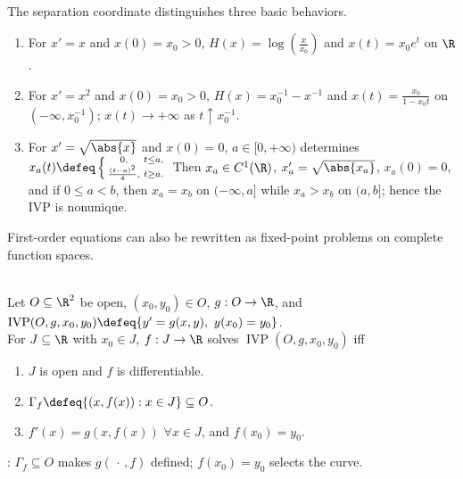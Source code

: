 \begin{example} \label{ex:autonomous-growth-blowup-and-waiting} \\
The separation coordinate distinguishes three basic behaviors.
\begin{enumerate}[label=(\roman*)]
\setlength{\itemsep}{0pt}
\item For $x'=x$ and $x(0)=x_0>0$, $H(x)=\log\left(\frac{x}{x_0}\right)$ and $x(t)=x_0e^t$ on $\R$.
\item For $x'=x^2$ and $x(0)=x_0>0$, $H(x)=x_0^{-1}-x^{-1}$ and $x(t)=\frac{x_0}{1-x_0t}$ on $(-\infty,x_0^{-1})$; $x(t)\to+\infty$ as $t\uparrow x_0^{-1}$.
\item For $x'=\sqrt{\abs{x}}$ and $x(0)=0$, $a\in[0,+\infty)$ determines $x_a(t)\defeq\left\{\begin{smallmatrix}0,&t\leq a,\\\frac{(t-a)^2}{4},&t\geq a.\end{smallmatrix}\right.$ Then $x_a\in C^1(\R)$, $x_a'=\sqrt{\abs{x_a}}$, $x_a(0)=0$, and if $0\leq a<b$, then $x_a=x_b$ on $(-\infty,a]$ while $x_a>x_b$ on $(a,b]$; hence the IVP is nonunique.
\end{enumerate}
\end{example}

First-order equations can also be rewritten as fixed-point problems on complete function spaces.

\begin{definition} \label{def:scalar-initial-value-problem} \\
Let $O\subseteq\R^2$ be open, $(x_0,y_0)\in O$, $g:O\to\R$, and $\operatorname{IVP}(O,g,x_0,y_0)\defeq\{y'=g(x,y),\ y(x_0)=y_0\}$.\\
For $J\subseteq\R$ with $x_0\in J$, $f:J\to\R$ solves $\operatorname{IVP}(O,g,x_0,y_0)$ iff
\begin{enumerate}[label=(\roman*)]
\setlength{\itemsep}{0pt}
\item $J$ is open and $f$ is differentiable.
\item $\Gamma_f\defeq\{(x,f(x)):x\in J\}\subseteq O$.
\item $f'(x)=g(x,f(x))$ $\forall x\in J$, and $f(x_0)=y_0$.
\end{enumerate}
: $\Gamma_f\subseteq O$ makes $g(\,\cdot\,,f)$ defined; $f(x_0)=y_0$ selects the curve.
\end{definition}

